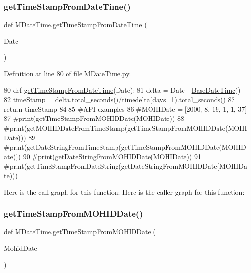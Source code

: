 \subsubsection{\texorpdfstring{get\+Time\+Stamp\+From\+Date\+Time()}{getTimeStampFromDateTime()}}
{\footnotesize\ttfamily def M\+Date\+Time.\+get\+Time\+Stamp\+From\+Date\+Time (\begin{DoxyParamCaption}\item[{}]{Date }\end{DoxyParamCaption})}



Definition at line 80 of file M\+Date\+Time.\+py.


\begin{DoxyCode}
80 \textcolor{keyword}{def }\mbox{\hyperlink{namespace_m_date_time_a577bd538a3fcb0bbddf8900288324eb5}{getTimeStampFromDateTime}}(Date):
81     delta = Date - \mbox{\hyperlink{namespace_m_date_time_a3e8d38d306730c6707a17503e2d21d6c}{BaseDateTime}}()
82     timeStamp = delta.total\_seconds()/timedelta(days=1).total\_seconds()
83     \textcolor{keywordflow}{return} timeStamp
84 
85 \textcolor{comment}{#API examples}
86 \textcolor{comment}{#MOHIDate = [2000, 8, 19, 1, 1, 37]}
87 \textcolor{comment}{#print(getTimeStampFromMOHIDDate(MOHIDate))}
88 \textcolor{comment}{#print(getMOHIDDateFromTimeStamp(getTimeStampFromMOHIDDate(MOHIDate)))}
89 \textcolor{comment}{#print(getDateStringFromTimeStamp(getTimeStampFromMOHIDDate(MOHIDate)))}
90 \textcolor{comment}{#print(getDateStringFromMOHIDDate(MOHIDate))}
91 \textcolor{comment}{#print(getTimeStampFromDateString(getDateStringFromMOHIDDate(MOHIDate)))}
\end{DoxyCode}
Here is the call graph for this function\+:
Here is the caller graph for this function\+:
\mbox{\label{namespace_m_date_time_a038322da9ec8ee2770a307c6a63187dd}} 
\subsubsection{\texorpdfstring{get\+Time\+Stamp\+From\+M\+O\+H\+I\+D\+Date()}{getTimeStampFromMOHIDDate()}}
{\footnotesize\ttfamily def M\+Date\+Time.\+get\+Time\+Stamp\+From\+M\+O\+H\+I\+D\+Date (\begin{DoxyParamCaption}\item[{}]{Mohid\+Date }\end{DoxyParamCaption})}



